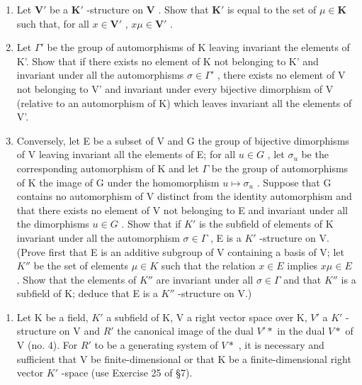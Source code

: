 \begin{enumerate}
\def\labelenumi{(\alph{enumi})}
\item
  Let \(\mathbf{V}'\) be a \(\mathbf{K}'\) -structure on \(\mathbf{V}\) . Show that \(\mathbf{K}'\) is equal to the set of \(\mu \in \mathbf{K}\) such that, for all \(x \in \mathbf{V}'\) , \(x\mu \in \mathbf{V}'\) .
\item
  Let \(\Gamma'\) be the group of automorphisms of K leaving invariant the elements of K'. Show that if there exists no element of K not belonging to K' and invariant under all the automorphisms \(\sigma \in \Gamma'\) , there exists no element of V not belonging to V' and invariant under every bijective dimorphism of V (relative to an automorphism of K) which leaves invariant all the elements of V'.
\item
  Conversely, let E be a subset of V and G the group of bijective dimorphisms of V leaving invariant all the elements of E; for all \(u \in G\) , let \(\sigma_{u}\) be the corresponding automorphism of K and let \(\Gamma\) be the group of automorphisms of K the image of G under the homomorphism \(u \mapsto \sigma_{u}\) . Suppose that G contains no automorphism of V distinct from the identity automorphism and that there exists no element of V not belonging to E and invariant under all the dimorphisms \(u \in G\) . Show that if \(K'\) is the subfield of elements of K invariant under all the automorphism \(\sigma \in \Gamma\) , E is a \(K'\) -structure on V. (Prove first that E is an additive subgroup of V containing a basis of V; let \(K''\) be the set of elements \(\mu \in K\) such that the relation \(x \in E\) implies \(x\mu \in E\) . Show that the elements of \(K''\) are invariant under all \(\sigma \in \Gamma\) and that \(K''\) is a subfield of K; deduce that E is a \(K''\) -structure on V.)
\end{enumerate}

\begin{enumerate}
\def\labelenumi{\arabic{enumi}.}
\setcounter{enumi}{1}
\tightlist
\item
  Let K be a field, \(K'\) a subfield of K, V a right vector space over K, \(V'\) a \(K'\) -structure on V and \(R'\) the canonical image of the dual \(V'*\) in the dual \(V*\) of V (no. 4). For \(R'\) to be a generating system of \(V*\) , it is necessary and sufficient that V be finite-dimensional or that K be a finite-dimensional right vector \(K'\) -space (use Exercise 25 of §7).
\end{enumerate}

